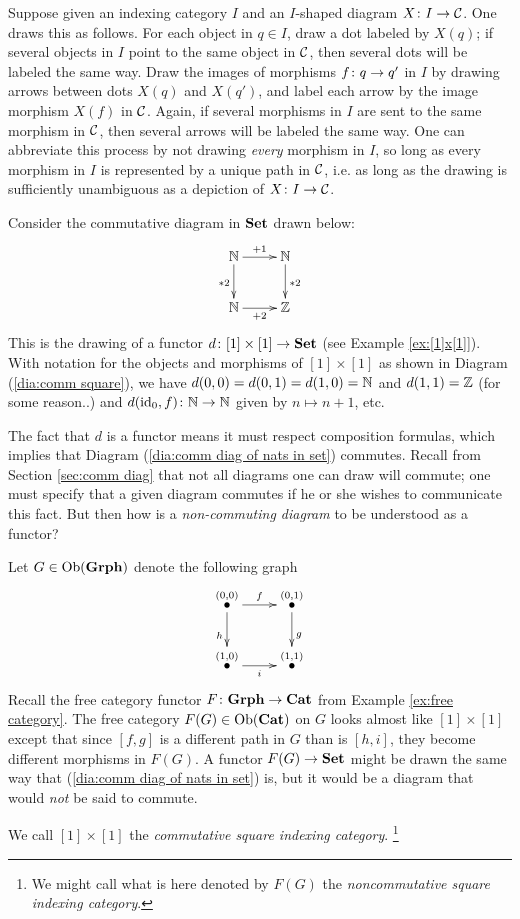 \documentclass[CT4S-EN-RU]{subfiles}
\begin{document}
\begin{blockENG}
Suppose given an indexing category $I$ and an $I$-shaped diagram $X\colon I\rightarrow\mathcal{C}$. One draws this as follows. For each object in $q\in I$, draw a dot labeled by $X(q)$; if several objects in $I$ point to the same object in $\mathcal{C}$, then several dots will be labeled the same way. Draw the images of morphisms $f\colon q\rightarrow q'$ in $I$ by drawing arrows between dots $X(q)$ and $X(q')$, and label each arrow by the image morphism $X(f)$ in $\mathcal{C}$. Again, if several morphisms in $I$ are sent to the same morphism in $\mathcal{C}$, then several arrows will be labeled the same way. One can abbreviate this process by not drawing {\em every} morphism in $I$, so long as every morphism in $I$ is represented by a unique path in $\mathcal{C}$, i.e. as long as the drawing is sufficiently unambiguous as a depiction of $X\colon I\rightarrow\mathcal{C}$.
\end{blockENG}

\begin{blockRUS}
\end{blockRUS}

\begin{exampleENG}\label{ex:comm vs noncomm diags}
Consider the commutative diagram in ${\bf Set}$ drawn below:
\begin{align}\label{dia:comm diag of nats in set}
\xymatrix{\NN\ar[r]^{+1}\ar[d]_{*2}&\NN\ar[d]^{*2}\\\NN\ar[r]_{+2}&\ZZ}
\end{align}
This is the drawing of a functor $d\colon[1]\times[1]\rightarrow{\bf Set}$ (see Example \ref{ex:[1]x[1]}). With notation for the objects and morphisms of $[1]\times[1]$ as shown in Diagram (\ref{dia:comm square}), we have $d(0,0)=d(0,1)=d(1,0)={\mathbb N}$ and $d(1,1)={\mathbb Z}$ (for some reason..) and $d(\textnormal{id}_0,f)\colon{\mathbb N}\rightarrow{\mathbb N}$ given by $n\mapsto n+1$, etc. 

The fact that $d$ is a functor means it must respect composition formulas, which implies that Diagram (\ref{dia:comm diag of nats in set}) commutes. Recall from Section \ref{sec:comm diag} that not all diagrams one can draw will commute; one must specify that a given diagram commutes if he or she wishes to communicate this fact. But then how is a {\em non-commuting diagram} to be understood as a functor?

Let $G\in\textnormal{Ob}({\bf Grph})$ denote the following graph 
$$\xymatrix{\LMO{(0,0)}\ar[r]^f\ar[d]_h&\LMO{(0,1)}\ar[d]^{g}\\\LMO{(1,0)}\ar[r]_{i}&\LMO{(1,1)}}$$
Recall the free category functor $F\colon{\bf Grph}\rightarrow{\bf Cat}$ from Example \ref{ex:free category}. The free category $F(G)\in\textnormal{Ob}({\bf Cat})$ on $G$ looks almost like $[1]\times[1]$ except that since $[f,g]$ is a different path in $G$ than is $[h,i]$, they become different morphisms in $F(G)$. A functor $F(G)\rightarrow{\bf Set}$ might be drawn the same way that (\ref{dia:comm diag of nats in set}) is, but it would be a diagram that would {\em not} be said to commute.

We call $[1]\times [1]$ the {\em commutative square indexing category}. 
\footnote{We might call what is here denoted by $F(G)$ the {\em noncommutative square indexing category}.}
\end{exampleENG}
\end{document}

